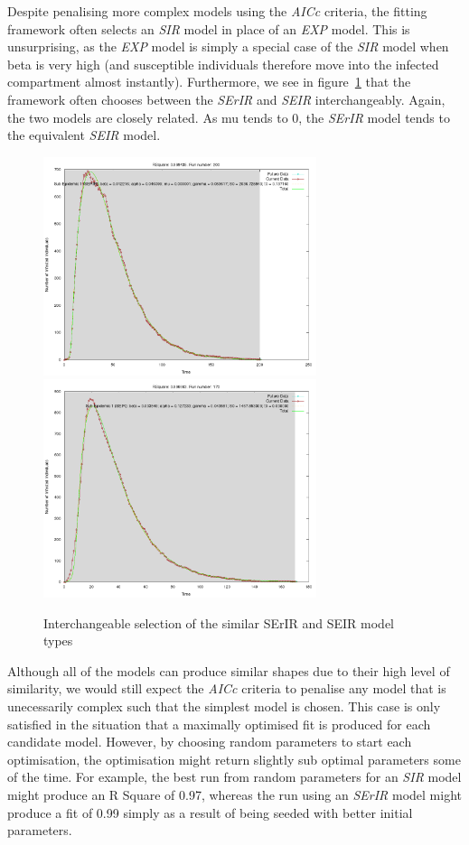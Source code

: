 Despite penalising more complex models using the \emph{AICc} criteria, the
fitting framework often selects an \emph{SIR} model in place of an
\emph{EXP} model. This is unsurprising, as the \emph{EXP} model is
simply a special case of the \emph{SIR} model when beta is very high
(and susceptible individuals therefore move into the infected
compartment almost instantly). Furthermore, we see in
figure~\ref{fig:unknown2} that the framework
often chooses between the \emph{SErIR} and \emph{SEIR} interchangeably. Again,
the two models are closely related. As mu tends to 0, the \emph{SErIR}
model tends to the equivalent \emph{SEIR} model. 


\begin{centering}
\begin{figure}[h!]
  \includegraphics[width=8cm]{images/single/unknownwrong1.png}
  \includegraphics[width=8cm]{images/single/unknownwrong2.png}
  \caption{Interchangeable selection of the similar SErIR and SEIR
    model types}
\label{fig:unknown2}
  \end{figure}
\end{centering}


Although all of the models can produce similar shapes due to their high level of
similarity, we would still expect the \emph{AICc} criteria to penalise
any model that is unecessarily complex such that the simplest model is
chosen. This case is only satisfied in the situation that a maximally
optimised fit is produced for each candidate model. However, by
choosing random parameters to start each optimisation, the
optimisation might return slightly sub optimal parameters some of the
time. For example, the best run from random parameters for an
\emph{SIR} model might produce an R Square of 0.97, whereas the run
using an \emph{SErIR} model might produce a fit of 0.99 simply as a
result of being seeded with better initial parameters. 

